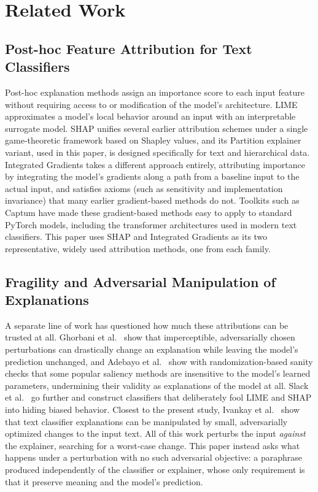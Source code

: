 \section{Related Work}
\label{sec:related-work}

\subsection{Post-hoc Feature Attribution for Text Classifiers}

Post-hoc explanation methods assign an importance score to each input
feature without requiring access to or modification of the model's
architecture. LIME \citep{ribeiro2016why} approximates a model's local
behavior around an input with an interpretable surrogate model. SHAP
\citep{lundberg2017unified} unifies several earlier attribution schemes
under a single game-theoretic framework based on Shapley values, and its
Partition explainer variant, used in this paper, is designed
specifically for text and hierarchical data. Integrated Gradients
\citep{sundararajan2017axiomatic} takes a different approach entirely,
attributing importance by integrating the model's gradients along a path
from a baseline input to the actual input, and satisfies axioms (such as
sensitivity and implementation invariance) that many earlier
gradient-based methods do not. Toolkits such as Captum
\citep{kokhlikyan2020captum} have made these gradient-based methods
easy to apply to standard PyTorch models, including the transformer
architectures used in modern text classifiers. This paper uses SHAP and
Integrated Gradients as its two representative, widely used attribution
methods, one from each family.

\subsection{Fragility and Adversarial Manipulation of Explanations}

A separate line of work has questioned how much these attributions can
be trusted at all. Ghorbani et al.\ \citep{ghorbani2019interpretation}
show that imperceptible, adversarially chosen perturbations can
drastically change an explanation while leaving the model's prediction
unchanged, and Adebayo et al.\ \citep{adebayo2018sanity} show with
randomization-based sanity checks that some popular saliency methods are
insensitive to the model's learned parameters, undermining their
validity as explanations of the model at all. Slack et al.\
\citep{slack2020fooling} go further and construct classifiers that
deliberately fool LIME and SHAP into hiding biased behavior. Closest to
the present study, Ivankay et al.\
\citep{ivankay2022fooling,ivankay2022estimating} show that text
classifier explanations can be manipulated by small, adversarially
optimized changes to the input text. All of this work perturbs the
input \emph{against} the explainer, searching for a worst-case change.
This paper instead asks what happens under a perturbation with no such
adversarial objective: a paraphrase produced independently of the
classifier or explainer, whose only requirement is that it preserve
meaning and the model's prediction.


